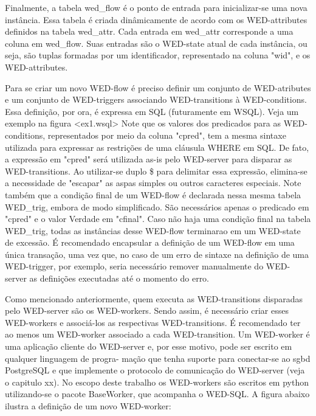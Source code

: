   Finalmente, a tabela wed_flow é o ponto de entrada para inicializar-se uma nova instância. Essa tabela é criada dinâmicamente
de acordo com os WED-attributes definidos na tabela wed_attr. Cada entrada em wed_attr corresponde a uma coluna em wed_flow.
Suas entradas são o WED-state atual de cada instância, ou seja, são tuplas formadas por um identificador, representado
na coluna "wid", e os WED-attributes. 
  

  Para se criar um novo WED-flow é preciso definir um conjunto de WED-atributes e um conjunto de WED-triggers associando
WED-transitions à WED-conditions. Essa definição, por ora, é expressa em SQL (futuramente em WSQL). Veja um exemplo na
figura <ex1.wsql>
  Note que os valores dos predicados para as WED-conditions, representados por meio da coluna "cpred", tem a mesma sintaxe
utilizada para expressar as restrições de uma cláusula WHERE em SQL. De fato, a expressão em "cpred" será utilizada as-is
pelo WED-server para disparar as WED-transitions. Ao utilizar-se duplo \$ para delimitar essa expressão, elimina-se a necessidade
de "escapar" as aspas simples ou outros caracteres especiais.
  Note também que a condição final de um WED-flow é declarada nessa mesma tabela WED_trig, embora de modo simplificado.
São necessários apenas o predicado em "cpred" e o valor Verdade em "cfinal". Caso não haja uma condição final na tabela
WED_trig, todas as instâncias desse WED-flow terminarao em um WED-state de excessão.
  É recomendado encapsular a definição de um WED-flow em uma única transação, uma vez que, no caso de um erro de sintaxe
na definição de uma WED-trigger, por exemplo, seria necessário remover manualmente do WED-server as definições executadas
até o momento do erro. 
  
  Como mencionado anteriormente, quem executa as WED-transitions disparadas pelo WED-server são os WED-workers. Sendo assim,
é necessário criar esses WED-workers e associá-los as respectivas WED-transitions. É recomendado ter ao menos um WED-worker
associado a cada WED-transition.
  Um WED-worker é uma aplicação cliente do WED-server e, por esse motivo, pode ser escrito em qualquer linguagem de progra-
mação que tenha suporte para conectar-se ao sgbd PostgreSQL e que implemente o protocolo de comunicação do WED-server (veja
o capitulo xx). 
  No escopo deste trabalho os WED-workers são escritos em python utilizando-se o pacote BaseWorker, que acompanha o WED-SQL.
A figura abaixo ilustra a definição de um novo WED-worker:

